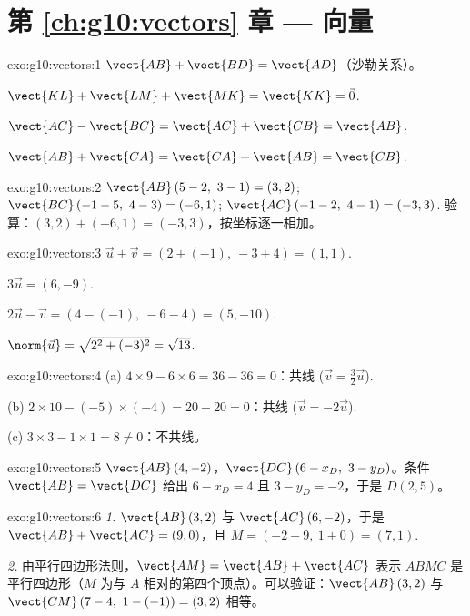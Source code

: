 \section*{第 \ref{ch:g10:vectors} 章 --- 向量}

\begin{solution}{exo:g10:vectors:1}
$\vect{AB} + \vect{BD} = \vect{AD}$（沙勒关系）。

$\vect{KL} + \vect{LM} + \vect{MK} = \vect{KK} = \vec 0$.

$\vect{AC} - \vect{BC} = \vect{AC} + \vect{CB} = \vect{AB}$.

$\vect{AB} + \vect{CA} = \vect{CA} + \vect{AB} = \vect{CB}$.
\end{solution}

\begin{solution}{exo:g10:vectors:2}
$\vect{AB}\,(5-2,\ 3-1) = (3, 2)$; \quad
$\vect{BC}\,(-1-5,\ 4-3) = (-6, 1)$; \quad
$\vect{AC}\,(-1-2,\ 4-1) = (-3, 3)$.
验算：$(3, 2) + (-6, 1) = (-3, 3)$，按坐标逐一相加。
\end{solution}

\begin{solution}{exo:g10:vectors:3}
$\vec u + \vec v = (2 + (-1),\ -3 + 4) = (1, 1)$.

$3\vec u = (6, -9)$.

$2\vec u - \vec v = (4 - (-1),\ -6 - 4) = (5, -10)$.

$\norm{\vec u} = \sqrt{2^2 + (-3)^2} = \sqrt{13}$.
\end{solution}

\begin{solution}{exo:g10:vectors:4}
(a) $4 \times 9 - 6 \times 6 = 36 - 36 = 0$：共线
($\vec v = \frac32 \vec u$).

(b) $2 \times 10 - (-5) \times (-4) = 20 - 20 = 0$：共线
($\vec v = -2\vec u$).

(c) $3 \times 3 - 1 \times 1 = 8 \neq 0$：不共线。
\end{solution}

\begin{solution}{exo:g10:vectors:5}
$\vect{AB}\,(4, -2)$，$\vect{DC}\,(6 - x_D,\ 3 - y_D)$。条件
$\vect{AB} = \vect{DC}$ 给出 $6 - x_D = 4$ 且 $3 - y_D = -2$，于是
$D(2, 5)$。
\end{solution}

\begin{solution}{exo:g10:vectors:6}
\emph{1.} $\vect{AB}\,(3, 2)$ 与 $\vect{AC}\,(6, -2)$，于是
$\vect{AB} + \vect{AC} = (9, 0)$，且
$M = (-2 + 9,\ 1 + 0) = (7, 1)$.

\emph{2.} 由平行四边形法则，$\vect{AM} = \vect{AB} + \vect{AC}$
表示 $ABMC$ 是平行四边形（$M$ 为与
$A$ 相对的第四个顶点）。可以验证：$\vect{AB}\,(3,2)$ 与 $\vect{CM}\,(7-4,\ 1-(-1)) =
(3, 2)$ 相等。
\end{solution}

